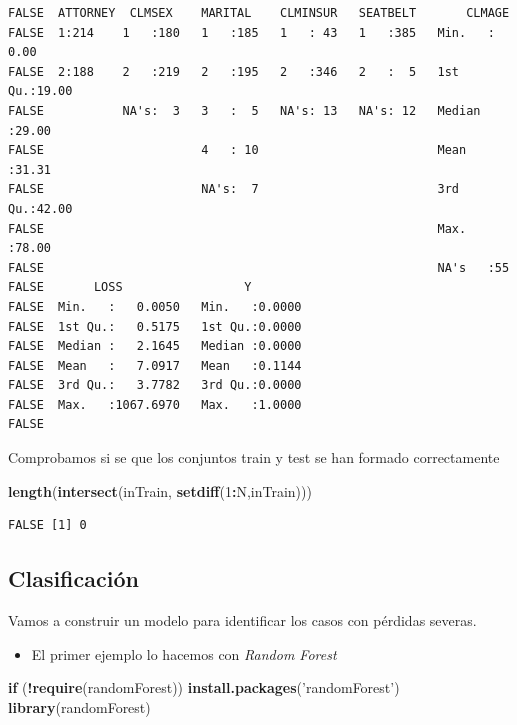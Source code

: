 \documentclass[]{book}
\newenvironment{Shaded}{\begin{snugshade}}{\end{snugshade}}
\newcommand{\ControlFlowTok}[1]{\textcolor[rgb]{0.13,0.29,0.53}{\textbf{#1}}}
\newcommand{\DecValTok}[1]{\textcolor[rgb]{0.00,0.00,0.81}{#1}}
\newcommand{\KeywordTok}[1]{\textcolor[rgb]{0.13,0.29,0.53}{\textbf{#1}}}
\newcommand{\NormalTok}[1]{#1}
\newcommand{\OperatorTok}[1]{\textcolor[rgb]{0.81,0.36,0.00}{\textbf{#1}}}
\newcommand{\StringTok}[1]{\textcolor[rgb]{0.31,0.60,0.02}{#1}}
\providecommand{\tightlist}{%
  \setlength{\itemsep}{0pt}\setlength{\parskip}{0pt}}
\begin{document}
\begin{verbatim}
FALSE  ATTORNEY  CLMSEX    MARITAL    CLMINSUR   SEATBELT       CLMAGE     
FALSE  1:214    1   :180   1   :185   1   : 43   1   :385   Min.   : 0.00  
FALSE  2:188    2   :219   2   :195   2   :346   2   :  5   1st Qu.:19.00  
FALSE           NA's:  3   3   :  5   NA's: 13   NA's: 12   Median :29.00  
FALSE                      4   : 10                         Mean   :31.31  
FALSE                      NA's:  7                         3rd Qu.:42.00  
FALSE                                                       Max.   :78.00  
FALSE                                                       NA's   :55     
FALSE       LOSS                 Y         
FALSE  Min.   :   0.0050   Min.   :0.0000  
FALSE  1st Qu.:   0.5175   1st Qu.:0.0000  
FALSE  Median :   2.1645   Median :0.0000  
FALSE  Mean   :   7.0917   Mean   :0.1144  
FALSE  3rd Qu.:   3.7782   3rd Qu.:0.0000  
FALSE  Max.   :1067.6970   Max.   :1.0000  
FALSE 
\end{verbatim}

Comprobamos si se que los conjuntos train y test se han formado correctamente

\begin{Shaded}
\begin{Highlighting}[]
  \KeywordTok{length}\NormalTok{(}\KeywordTok{intersect}\NormalTok{(inTrain, }\KeywordTok{setdiff}\NormalTok{(}\DecValTok{1}\OperatorTok{:}\NormalTok{N,inTrain)))}
\end{Highlighting}
\end{Shaded}

\begin{verbatim}
FALSE [1] 0
\end{verbatim}

\hypertarget{clasificacion-1}{%
\subsection{Clasificación}\label{clasificacion-1}}

Vamos a construir un modelo para identificar los casos con pérdidas severas.

\begin{itemize}
\tightlist
\item
  El primer ejemplo lo hacemos con \emph{Random Forest}
\end{itemize}

\begin{Shaded}
\begin{Highlighting}[]
\ControlFlowTok{if}\NormalTok{ (}\OperatorTok{!}\KeywordTok{require}\NormalTok{(randomForest)) }\KeywordTok{install.packages}\NormalTok{(}\StringTok{'randomForest'}\NormalTok{)}
\KeywordTok{library}\NormalTok{(randomForest)}
\end{Highlighting}
\end{Shaded}
\end{document}
